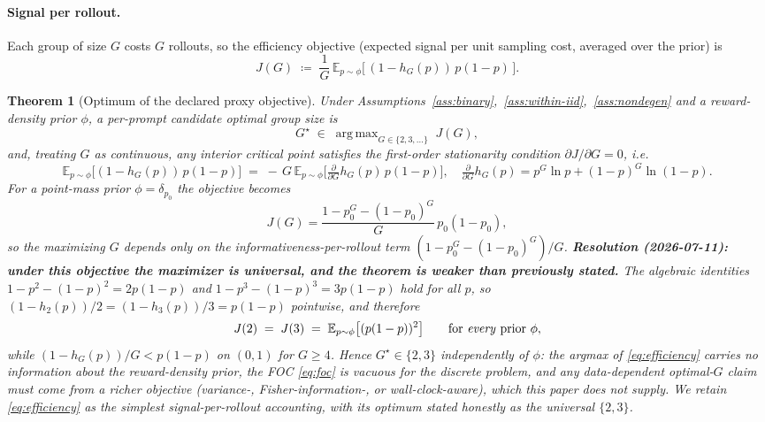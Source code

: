 \documentclass[11pt]{article}
\theoremstyle{plain}
\newtheorem{theorem}{Theorem}
\theoremstyle{definition}
\theoremstyle{remark}
\newcommand{\E}{\mathbb{E}}
\newcommand{\1}{\mathbb{1}}
\DeclareMathOperator*{\argmax}{arg\,max}
\begin{document}
\paragraph{Signal per rollout.} Each group of size $G$ costs $G$ rollouts, so
the efficiency objective (expected signal per unit sampling cost, averaged over
the prior) is
\begin{equation}\label{eq:efficiency}
J(G) \;\coloneqq\; \frac{1}{G}\,
\E_{p\sim\phi}\!\big[\,(1-h_G(p))\,p(1-p)\,\big].
\end{equation}

\begin{theorem}[Optimum of the declared proxy objective]\label{thm:T3}
Under Assumptions~\ref{ass:binary},~\ref{ass:within-iid},~\ref{ass:nondegen}
and a reward-density prior $\phi$, a per-prompt \emph{candidate} optimal
group size is
\begin{equation}\label{eq:Gstar}
G^\star \;\in\; \argmax_{G\in\{2,3,\dots\}} \; J(G),
\end{equation}
and, treating $G$ as continuous, any interior \emph{critical point} satisfies
the first-order stationarity condition $\partial J/\partial G = 0$, i.e.
\begin{equation}\label{eq:foc}
\E_{p\sim\phi}\!\Big[(1-h_G(p))\,p(1-p)\Big]
\;=\;
-\,G\,\E_{p\sim\phi}\!\Big[\tfrac{\partial}{\partial G}h_G(p)\,p(1-p)\Big],
\quad
\tfrac{\partial}{\partial G}h_G(p)=p^G\ln p+(1-p)^G\ln(1-p).
\end{equation}
For a point-mass prior $\phi=\delta_{p_0}$ the objective becomes
\begin{equation}\label{eq:J-pointmass}
J(G)=\frac{1-p_0^G-(1-p_0)^G}{G}\,p_0(1-p_0),
\end{equation}
so the maximizing $G$ depends only on the
informativeness-per-rollout term
$(1-p_0^G-(1-p_0)^G)/G$.
\textbf{Resolution (2026-07-11): under this objective the maximizer is
universal, and the theorem is weaker than previously stated.} The
algebraic identities $1-p^2-(1-p)^2 = 2p(1-p)$ and
$1-p^3-(1-p)^3 = 3p(1-p)$ hold for all $p$, so
$(1-h_2(p))/2 = (1-h_3(p))/3 = p(1-p)$ pointwise, and therefore
\begin{equation}\label{eq:J23}
J(2) \;=\; J(3) \;=\; \E_{p\sim\phi}\big[(p(1-p))^2\big]
\qquad\text{for \emph{every} prior }\phi,
\end{equation}
while $(1-h_G(p))/G < p(1-p)$ on $(0,1)$ for $G\ge4$. Hence
$G^\star\in\{2,3\}$ \emph{independently of $\phi$}: the argmax of
\eqref{eq:efficiency} carries no information about the reward-density
prior, the FOC \eqref{eq:foc} is vacuous for the discrete problem, and
any \emph{data-dependent} optimal-$G$ claim must come from a richer
objective (variance-, Fisher-information-, or wall-clock-aware), which
this paper does not supply. We retain \eqref{eq:efficiency} as the
simplest signal-per-rollout accounting, with its optimum stated
honestly as the universal $\{2,3\}$.
\end{theorem}
\end{document}
